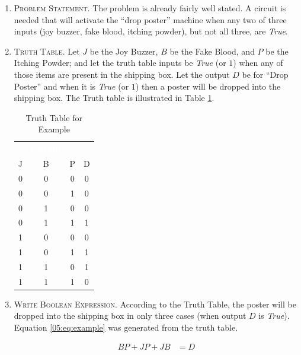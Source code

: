 \begin{enumerate}
  \item \textsc{Problem Statement}. The problem is already fairly well stated. A circuit is needed that will activate the ``drop poster'' machine when any two of three inputs (joy buzzer, fake blood, itching powder), but not all three, are \emph{True}. 

  \item \textsc{Truth Table}. Let $ J $ be the Joy Buzzer, $ B $ be the Fake Blood, and $ P $ be the Itching Powder; and let the truth table inputs be \emph{True} (or $ 1 $) when any of those items are present in the shipping box. Let the output $ D $ be for ``Drop Poster'' and when it is \emph{True} (or $ 1 $) then a poster will be dropped into the shipping box. The Truth table is illustrated in Table  \ref{05:tab:truth_table_for_example}.
  
  \begin{table}[H]
    \sffamily
    \newcommand{\head}[1]{\textcolor{white}{\textbf{#1}}}    
    \begin{center}
      \begin{tabular}{cccc} 
        \rowcolor{black!75}
        \multicolumn{3}{c}{\head{Inputs}} & \head{Output} \\
        J & B & P & D \\
        \hline
        0 & 0 & 0 & 0 \\
        0 & 0 & 1 & 0 \\
        0 & 1 & 0 & 0 \\
        0 & 1 & 1 & 1 \\
        1 & 0 & 0 & 0 \\
        1 & 0 & 1 & 1 \\
        1 & 1 & 0 & 1 \\
        1 & 1 & 1 & 0
      \end{tabular}
    \end{center}
    \caption{Truth Table for Example}
    \label{05:tab:truth_table_for_example}
  \end{table}
  
  \item \textsc{Write Boolean Expression}. According to the Truth Table, the poster will be dropped into the shipping box in only three cases (when output $ D $ is \emph{True}). Equation \ref{05:eq:example} was generated from the truth table. 
  
  \begin{align}
  \label{05:eq:example}
  BP + JP + JB &= D 
  \end{align}
  

\end{enumerate}
